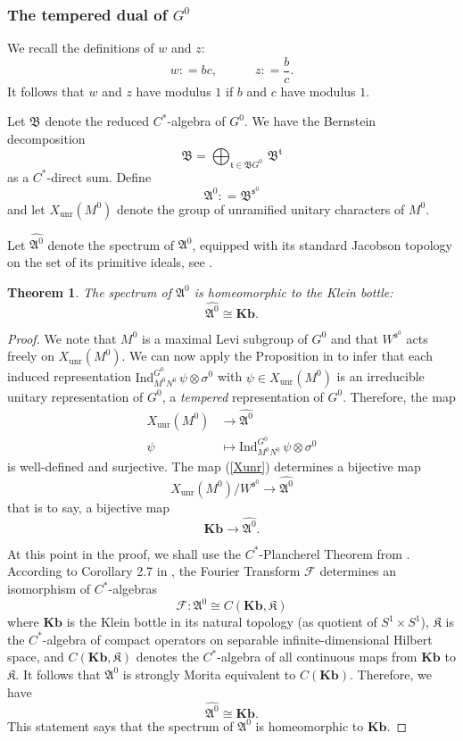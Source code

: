 \documentclass[11pt]{amsart}
\newtheorem{theorem}{Theorem}[section]
\theoremstyle{remark}
\theoremstyle{definition}
\def\fB{\mathfrak{B}}
\newcommand{\unr}{\mathrm{unr}}
\newcommand{\fs}{\mathfrak{s}}
\def\fA{\mathfrak{A}}
\def\fB{\mathfrak{B}}
\def\fK{\mathfrak{K}}
\def\ft{\mathfrak{t}}
\begin{document}
\subsubsection{The tempered dual of $G^0$}   We recall the definitions of $w$ and $z$:
\[
w: = bc, \qquad \quad z: = \frac{b}{c}.
\]
It follows that $w$ and $z$ have modulus $1$ if $b$ and $c$ have modulus $1$.   

Let $\fB$ denote the reduced $C^\ast$-algebra of $G^0$.   We have the Bernstein decomposition
\[
\fB  = \bigoplus_{\ft\in\fB G^0} \, \fB^{\ft}
\]
as a $C^\ast$-direct sum.   Define
\[
\fA^0: = \fB^{\fs^0}
\]
and let $X_{\unr}(M^0)$ denote the group of unramified unitary characters of $M^0$.   

  
 Let $\widehat{\fA^0}$ denote the spectrum of $\fA^0$, equipped with its standard Jacobson topology on the set of its primitive ideals, see \cite[\S3.1]{D}.  
 
 \begin{theorem}\label{spectrum} The spectrum of $\fA^0$ is homeomorphic to the Klein bottle:
 \[
 \widehat{\fA^0} \cong \mathbf{Kb}.
 \]
 \end{theorem}
 \begin{proof} We note that $M^0$ is a maximal Levi subgroup of $G^0$ and that $W^{\fs^0}$ acts freely on $X_{\unr}(M^0)$.   We can now apply the Proposition in \cite[\S4.3]{R} 
to infer that each induced representation $\mathrm{Ind}_{M^0N^0}^{G^0} \, \psi \otimes \sigma^0$ with $ \psi \in X_{\unr}(M^0)$ is an irreducible unitary representation of $G^0$,  a \emph{tempered}
representation of $G^0$.      Therefore, the map
\begin{align}\label{Xunr}
X_{\unr}(M^0) & \longrightarrow \widehat{\fA^0} \\
\psi & \mapsto \mathrm{Ind}_{M^0N^0}^{G^0} \, \psi \otimes \sigma^0  \nonumber
\end{align}
is well-defined and surjective.   The map (\ref{Xunr}) determines a bijective map
\[
X_{\unr}(M^0) / W^{\fs^0} \longrightarrow \widehat{\fA^0}
\]
that is to say,  a bijective map
\[
\mathbf{Kb} \longrightarrow \widehat{\fA^0}.
\]

At this point in the proof, we shall use the $C^*$-Plancherel Theorem from \cite{P}.   According to Corollary 2.7 in \cite{P}, the Fourier Transform $\mathcal{F}$ determines an isomorphism of $C^*$-algebras
\[
\mathcal{F} : \fA^0 \cong C(\mathbf{Kb}, \mathfrak{K})
\]
where $\mathbf{Kb}$ is the Klein bottle in its natural topology (as quotient of $S^1  \times S^1$), $\mathfrak{K}$ is the $C^*$-algebra of compact operators on separable infinite-dimensional Hilbert space, and $C(\mathbf{Kb}, \fK)$ 
denotes the $C^*$-algebra of all continuous maps from  $\mathbf{Kb}$ to $\fK$.  It follows that $\fA^0$ is strongly Morita equivalent to $C(\mathbf{Kb})$.   Therefore, we have
\[
\widehat{\fA^0} \cong \mathbf{Kb}.
\]
This statement says that the spectrum of $\fA^0$  is homeomorphic to $\mathbf{Kb}$.  
\end{proof} 
\end{document}
